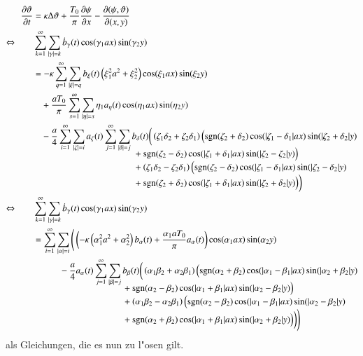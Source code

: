 \begin{align*}
\frac{\partial\vartheta}{\partial t}
&=
\kappa\Delta\vartheta
+ \frac{T_0}{\pi}\frac{\partial\psi}{\partial x}
- \frac{\partial(\psi,\vartheta)}{\partial(x,y)}
\\
\Leftrightarrow \qquad
&
\sum_{k = 1}^{\infty}
\sum_{|\gamma| = k}
\dot{b}_{\gamma}(t)
\cos(\gamma_1 ax) \sin(\gamma_2 y)
\\
&=
-
\kappa
\sum_{q = 1}^{\infty}
\sum_{|\xi| = q}
b_{\xi}(t)
\left(\xi_1^2 a^2 + \xi_2^2\right)
\cos(\xi_1 ax) \sin(\xi_2 y)
\\
&\phantom{={}}
+
\frac{a T_0}{\pi}
\sum_{s = 1}^{\infty}
\sum_{|\eta| = s}
\eta_1
a_{\eta}(t)
\cos(\eta_1 ax) \sin(\eta_2 y)
\\
&\phantom{={}}
-
\frac{a}{4}
\sum_{i = 1}^{\infty}
\sum_{|\zeta| = i}
a_{\zeta}(t)
\sum_{j = 1}^{\infty}
\sum_{|\delta| = j}
b_{\delta}(t)
\bigg(
\left(\zeta_1 \delta_2 + \zeta_2 \delta_1 \right)
\Big(
\sgn(\zeta_2 + \delta_2)
\cos(|\zeta_1 - \delta_1|ax)\sin(|\zeta_2 + \delta_2|y)
\\[-2ex]
&\phantom{=-abbb\sum\sum.....{}ccccccc}
+
\sgn(\zeta_2 - \delta_2)
\cos(|\zeta_1 + \delta_1|ax)\sin(|\zeta_2 - \zeta_2|y)
\Big)
\\[-1ex]
&\phantom{=-abbb\sum\sum.....{}ccccccc}
+
\left(\zeta_1 \delta_2 - \zeta_2 \delta_1 \right)
\Big(
\sgn(\zeta_2 - \delta_2)
\cos(|\zeta_1 - \delta_1|ax)\sin(|\zeta_2 - \delta_2|y)
\\[-1ex]
&\phantom{=-abbb\sum\sum.....{}ccccccc}
+
\sgn(\zeta_2 + \delta_2)
\cos(|\zeta_1 + \delta_1|ax)\sin(|\zeta_2 + \delta_2|y)
\Big)
\bigg)
\\
\Leftrightarrow \qquad
&
\sum_{k = 1}^{\infty}
\sum_{|\gamma| = k}
\dot{b}_{\gamma}(t)
\cos(\gamma_1 ax) \sin(\gamma_2 y)
\\
&=
\sum_{i = 1}^{\infty}
\sum_{|\alpha| = i}
\Bigg(
\left(
-
\kappa
\left(\alpha_1^2 a^2 + \alpha_2^2\right)
b_{\alpha}(t)
+
\frac{\alpha_1 a T_0}{\pi}
a_{\alpha}(t)
\right)
\cos(\alpha_1 ax) \sin(\alpha_2 y)
\\
&\phantom{={}aaaa}
-
\frac{a}{4}
a_{\alpha}(t)
\sum_{j = 1}^{\infty}
\sum_{|\beta| = j}
b_{\beta}(t)
\bigg(
\left(\alpha_1 \beta_2 + \alpha_2 \beta_1 \right)
\Big(
\sgn(\alpha_2 + \beta_2)
\cos(|\alpha_1 - \beta_1|ax)\sin(|\alpha_2 + \beta_2|y)
\\[-2ex]
&\phantom{=-aat\sum\sum...{}ccccccc}
+
\sgn(\alpha_2 - \beta_2)
\cos(|\alpha_1 + \beta_1|ax)\sin(|\alpha_2 - \beta_2|y)
\Big)
\\[-1ex]
&\phantom{=-aat\sum\sum...{}ccccccc}
+
\left(\alpha_1 \beta_2 - \alpha_2 \beta_1 \right)
\Big(
\sgn(\alpha_2 - \beta_2)
\cos(|\alpha_1 - \beta_1|ax)\sin(|\alpha_2 - \beta_2|y)
\\[-1ex]
&\phantom{=-aat\sum\sum...{}ccccccc}
+
\sgn(\alpha_2 + \beta_2)
\cos(|\alpha_1 + \beta_1|ax)\sin(|\alpha_2 + \beta_2|y)
\Big)
\bigg)
\Bigg)
\end{align*}
als Gleichungen, die es nun zu l"osen gilt.

